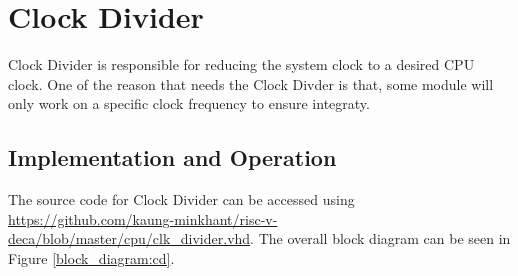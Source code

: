 \begin{table}[!h]
    \centering
    \caption{Control Signal Description}
    \label{table:control_description}
\end{table}

\newpage
\section{Clock Divider}
Clock Divider is responsible for reducing the system clock to a desired CPU clock.
One of the reason that needs the Clock Divder is that, some module will only work on a specific clock frequency to ensure integraty.
\subsection{Implementation and Operation}
The source code for Clock Divider
can be accessed using \url{https://github.com/kaung-minkhant/risc-v-deca/blob/master/cpu/clk_divider.vhd}.
The overall block diagram can be seen in Figure \ref{block_diagram:cd}.

